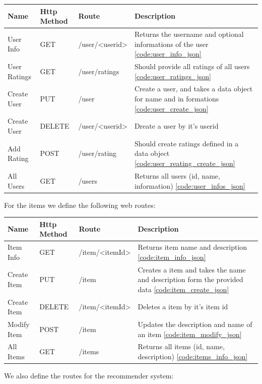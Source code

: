 \begin{longtable}{|p{2.5cm}|p{2.5cm}|p{3.2cm}|p{5cm}|}
    \hline
	  Name & Http Method & Route & Description \\
    \hline
    \hline
    User Info & GET & /user/<userid> & Returns the username and optional informations of the user \ref{code:user_info_json}\\
    \hline
    User Ratings & GET & /user/ratings & Should provide all ratings of all users \ref{code:user_ratings_json}\\
    \hline
    Create User & PUT & /user & Create a user, and takes a data object for name and in formations \ref{code:user_create_json}\\
    \hline
    Create User & DELETE & /user/<userid> & Dreate a user by it's userid\\
    \hline
    Add Rating & POST & /user/rating & Should create ratings defined in a data object \ref{code:user_reating_create_json}\\
    \hline
    All Users & GET & /users & Returns all users (id, name, information) \ref{code:user_infos_json}\\
    \hline
\end{longtable}

For the items we define the following web routes:

\begin{longtable}{|p{2.5cm}|p{2.5cm}|p{3.2cm}|p{5cm}|}
    \hline
	  Name & Http Method & Route & Description \\
    \hline
    \hline
    Item Info & GET & /item/<itemId> & Returns item name and description \ref{code:item_info_json}\\
    \hline
    Create Item & PUT & /item & Creates a item and takes the name and description form the provided data \ref{code:item_create_json}\\
    \hline
    Create Item & DELETE & /item/<itemId> & Deletes a item by it's item id\\
    \hline
    Modify Item & POST & /item & Updates the description and name of an item \ref{code:item_modify_json}\\
    \hline
    All Items & GET & /items & Returns all items (id, name, description) \ref{code:items_info_json}\\
    \hline
\end{longtable}

We also define the routes for the recommender system:

